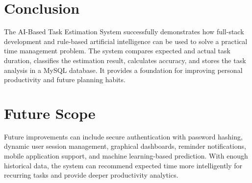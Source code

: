 \section{Conclusion}
\begin{justify}
The AI-Based Task Estimation System successfully demonstrates how full-stack development and rule-based artificial intelligence can be used to solve a practical time management problem. The system compares expected and actual task duration, classifies the estimation result, calculates accuracy, and stores the task analysis in a MySQL database. It provides a foundation for improving personal productivity and future planning habits.
\end{justify}

\section{Future Scope}
\begin{justify}
Future improvements can include secure authentication with password hashing, dynamic user session management, graphical dashboards, reminder notifications, mobile application support, and machine learning-based prediction. With enough historical data, the system can recommend expected time more intelligently for recurring tasks and provide deeper productivity analytics.
\end{justify}
